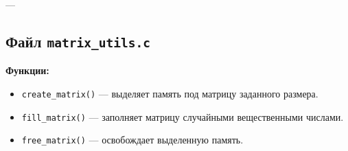 ---

\subsection*{Файл \texttt{matrix\_utils.c}}
\textbf{Функции:}
\begin{itemize}
    \item \texttt{create\_matrix()} — выделяет память под матрицу заданного размера.
    \item \texttt{fill\_matrix()} — заполняет матрицу случайными вещественными числами.
    \item \texttt{free\_matrix()} — освобождает выделенную память.
\end{itemize}

